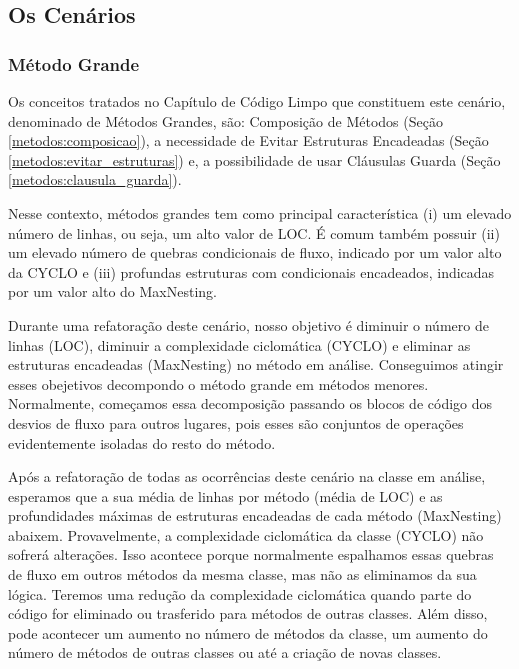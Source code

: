 \subsection{Os Cenários}

\subsubsection{Método Grande}

Os conceitos tratados no Capítulo de Código Limpo que constituem este cenário, denominado de Métodos Grandes, são: Composição de Métodos (Seção \ref{metodos:composicao}), a necessidade de Evitar Estruturas Encadeadas (Seção \ref{metodos:evitar_estruturas}) e, a possibilidade de usar Cláusulas Guarda (Seção \ref{metodos:clausula_guarda}).
	
Nesse contexto, métodos grandes tem como principal característica (i) um elevado número de linhas, ou seja, um alto valor de LOC. É comum também possuir (ii) um elevado número de quebras condicionais de fluxo, indicado por um valor alto da CYCLO e (iii) profundas estruturas com condicionais encadeados, indicadas por um valor alto do MaxNesting.
                                               
Durante uma refatoração deste cenário, nosso objetivo é diminuir o número de linhas (LOC), diminuir a complexidade ciclomática (CYCLO) e eliminar as estruturas encadeadas (MaxNesting) no método em análise. Conseguimos atingir esses obejetivos decompondo o método grande em métodos menores. Normalmente, começamos essa decomposição passando os blocos de código dos desvios de fluxo para outros lugares, pois esses são conjuntos de operações evidentemente isoladas do resto do método.
                                                
Após a refatoração de todas as ocorrências deste cenário na classe em análise, esperamos que a sua média de linhas por método (média de LOC) e as profundidades máximas de estruturas encadeadas de cada método (MaxNesting) abaixem. Provavelmente, a complexidade ciclomática da classe (CYCLO) não sofrerá alterações. Isso acontece porque normalmente espalhamos essas quebras de fluxo em outros métodos da mesma classe, mas não as eliminamos da sua lógica. Teremos uma redução da complexidade ciclomática quando parte do código for eliminado ou trasferido para métodos de outras classes. Além disso, pode acontecer um aumento no número de métodos da classe, um aumento do número de métodos de outras classes ou até a criação de novas classes.

